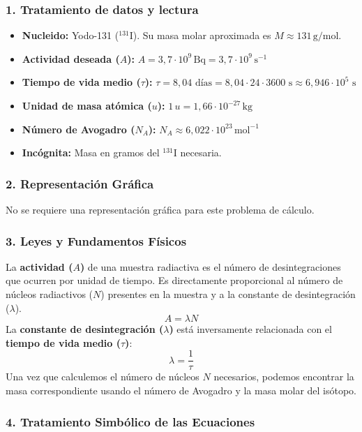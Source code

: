 \subsubsection*{1. Tratamiento de datos y lectura}
\begin{itemize}
    \item \textbf{Nucleido:} Yodo-131 (${}^{131}\text{I}$). Su masa molar aproximada es $M \approx 131 \, \text{g/mol}$.
    \item \textbf{Actividad deseada ($A$):} $A = 3,7 \cdot 10^9 \, \text{Bq} = 3,7 \cdot 10^9 \, \text{s}^{-1}$
    \item \textbf{Tiempo de vida medio ($\tau$):} $\tau = 8,04 \text{ días} = 8,04 \cdot 24 \cdot 3600 \text{ s} \approx 6,946 \cdot 10^5 \text{ s}$
    \item \textbf{Unidad de masa atómica ($u$):} $1 \, u = 1,66 \cdot 10^{-27} \, \text{kg}$
    \item \textbf{Número de Avogadro ($N_A$):} $N_A \approx 6,022 \cdot 10^{23} \, \text{mol}^{-1}$
    \item \textbf{Incógnita:} Masa en gramos del ${}^{131}\text{I}$ necesaria.
\end{itemize}

\subsubsection*{2. Representación Gráfica}
No se requiere una representación gráfica para este problema de cálculo.

\subsubsection*{3. Leyes y Fundamentos Físicos}
La \textbf{actividad ($A$)} de una muestra radiactiva es el número de desintegraciones que ocurren por unidad de tiempo. Es directamente proporcional al número de núcleos radiactivos ($N$) presentes en la muestra y a la constante de desintegración ($\lambda$).
$$A = \lambda N$$
La \textbf{constante de desintegración ($\lambda$)} está inversamente relacionada con el \textbf{tiempo de vida medio ($\tau$)}:
$$\lambda = \frac{1}{\tau}$$
Una vez que calculemos el número de núcleos $N$ necesarios, podemos encontrar la masa correspondiente usando el número de Avogadro y la masa molar del isótopo.

\subsubsection*{4. Tratamiento Simbólico de las Ecuaciones}
